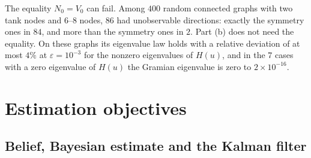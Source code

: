 \documentclass[conference]{IEEEtran}
\begin{document}
The equality $N_0=V_0$ can fail. Among $400$ random connected graphs with two tank nodes and $6$--$8$ nodes, $86$ had unobservable directions: exactly the symmetry ones in $84$, and more than the symmetry ones in $2$. Part (b) does not need the equality. On these graphs its eigenvalue law holds with a relative deviation of at most $4\%$ at $\varepsilon=10^{-3}$ for the nonzero eigenvalues of $H(u)$, and in the $7$ cases with a zero eigenvalue of $H(u)$ the Gramian eigenvalue is zero to $2\times10^{-16}$.

\begin{table}[t]
\centering
\caption{Symmetry-induced unobservable directions and orbit-breaking placement.}
\label{tab:symmetry}
\small
{}
\end{table}



\section{Estimation objectives}
\label{sec:belief}

\subsection{Belief, Bayesian estimate and the Kalman filter}
\end{document}
